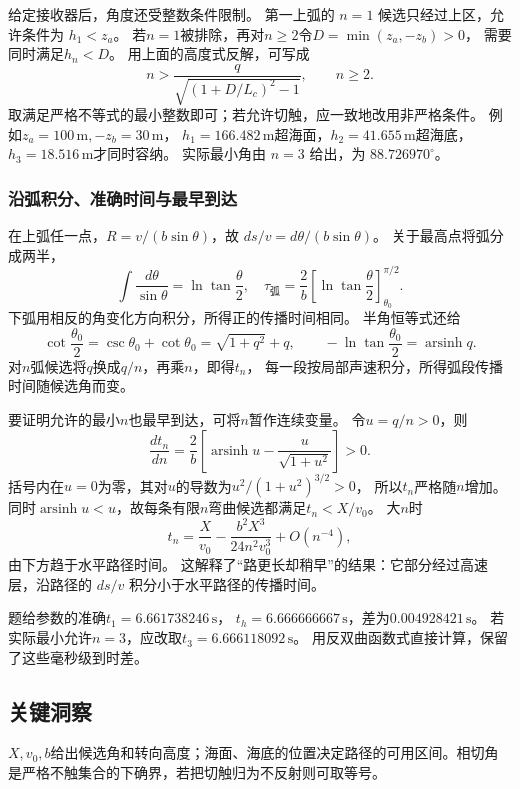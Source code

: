 \documentclass[UTF8,fontset=fandol,a4paper,11pt]{ctexart}
\begin{document}
给定接收器后，角度还受整数条件限制。
第一上弧的 $n=1$ 候选只经过上区，允许条件为 $h_1<z_a$。
若$n=1$被排除，再对$n\ge2$令$D=\min(z_a,-z_b)>0$，
需要同时满足$h_n<D$。
用上面的高度式反解，可写成
\[
n>\frac{q}{\sqrt{(1+D/L_c)^2-1}},\qquad n\ge2.
\]
取满足严格不等式的最小整数即可；若允许切触，应一致地改用非严格条件。
例如$z_a=100\,\mathrm m,-z_b=30\,\mathrm m$，
$h_1=166.482\,\mathrm m$超海面，$h_2=41.655\,\mathrm m$超海底，
$h_3=18.516\,\mathrm m$才同时容纳。
实际最小角由 $n=3$ 给出，为 $88.726970^\circ$。

\subsubsection*{沿弧积分、准确时间与最早到达}
在上弧任一点，$R=v/(b\sin\theta)$，故
$ds/v=d\theta/(b\sin\theta)$。
关于最高点将弧分成两半，
\[
\int\frac{d\theta}{\sin\theta}=\ln\tan\frac\theta2,
\quad\tau_{\text{弧}}=\frac2b
\left[\ln\tan\frac\theta2\right]_{\theta_0}^{\pi/2}.
\]
下弧用相反的角变化方向积分，所得正的传播时间相同。
半角恒等式还给
\[
\cot\frac{\theta_0}{2}
=\csc\theta_0+\cot\theta_0
=\sqrt{1+q^2}+q,\qquad
-\ln\tan\frac{\theta_0}{2}=\operatorname{arsinh}q.
\]
对$n$弧候选将$q$换成$q/n$，再乘$n$，即得$t_n$，
每一段按局部声速积分，所得弧段传播时间随候选角而变。

要证明允许的最小$n$也最早到达，可将$n$暂作连续变量。
令$u=q/n>0$，则
\[
\frac{dt_n}{dn}=\frac2b\left[
\operatorname{arsinh}u-\frac{u}{\sqrt{1+u^2}}\right]>0.
\]
括号内在$u=0$为零，其对$u$的导数为$u^2/(1+u^2)^{3/2}>0$，
所以$t_n$严格随$n$增加。
同时$\operatorname{arsinh}u<u$，故每条有限$n$弯曲候选都满足$t_n<X/v_0$。
大$n$时
\[
t_n=\frac X{v_0}-\frac{b^2X^3}{24n^2v_0^3}+O(n^{-4}),
\]
由下方趋于水平路径时间。
这解释了“路更长却稍早”的结果：它部分经过高速层，沿路径的 $ds/v$ 积分小于水平路径的传播时间。

题给参数的准确$t_1=6.661738246\,\mathrm s$，
$t_h=6.666666667\,\mathrm s$，差为$0.004928421\,\mathrm s$。
若实际最小允许$n=3$，应改取$t_3=6.666118092\,\mathrm s$。
用反双曲函数式直接计算，保留了这些毫秒级到时差。




\subsection*{关键洞察}

$X,v_0,b$给出候选角和转向高度；海面、海底的位置决定路径的可用区间。相切角是严格不触集合的下确界，若把切触归为不反射则可取等号。
\end{document}
